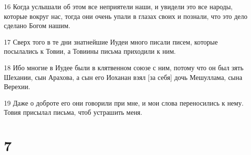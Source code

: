 \par 16 Когда услышали об этом все неприятели наши, и увидели это все народы, которые вокруг нас, тогда они очень упали в глазах своих и познали, что это дело сделано Богом нашим.
\par 17 Сверх того в те дни знатнейшие Иудеи много писали писем, которые посылались к Товии, а Товиины письма приходили к ним.
\par 18 Ибо многие в Иудее были в клятвенном союзе с ним, потому что он был зять Шехании, сын Арахова, а сын его Иоханан взял [за себя] дочь Мешуллама, сына Верехии.
\par 19 Даже о доброте его они говорили при мне, и мои слова переносились к нему. Товия присылал письма, чтоб устрашить меня.

\chapter{7}

